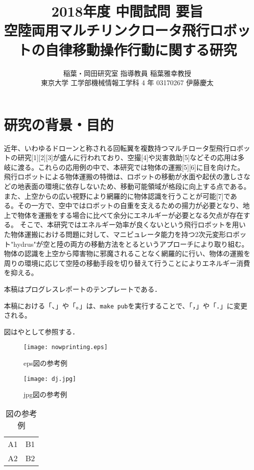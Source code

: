 \documentclass[twocolumn]{preport}
\title{2018年度 中間試問 要旨 \\
空陸両用マルチリンクロータ飛行ロボットの自律移動操作行動に関する研究}
\author{稲葉・岡田研究室 指導教員 稲葉雅幸教授 \\
東京大学 工学部機械情報工学科 4 年 03170267 伊藤慶太}
\begin{document}
\pagestyle{empty}
\maketitle
\thispagestyle{empty}
\sloppy

\section{研究の背景・目的}

近年、いわゆるドローンと称される回転翼を複数持つマルチロータ型飛行ロボットの研究[1][2][3]が盛んに行われており、空撮[4]や災害救助[5]などその応用は多岐に渡る。これらの応用例の中で、本研究では物体の運搬[5][6]に目を向けた。飛行ロボットによる物体運搬の特徴は、ロボットの移動が水面や起伏の激しさなどの地表面の環境に依存しないため、移動可能領域が格段に向上する点である。また、上空からの広い視野により網羅的に物体認識を行うことが可能[7]である。その一方で、空中ではロボットの自重を支えるための揚力が必要となり、地上で物体を運搬をする場合に比べて余分にエネルギーが必要となる欠点が存在する。
そこで、本研究ではエネルギー効率が良くないという飛行ロボットを用いた物体運搬における問題に対して、マニピュレータ能力を持つ2次元変形ロボット"hydrus"が空と陸の両方の移動方法をとるというアプローチにより取り組む。物体の認識を上空から障害物に邪魔されることなく網羅的に行い、物体の運搬を周りの環境に応じて空陸の移動手段を切り替えて行うことによりエネルギー消費を抑える。

本稿はプログレスレポートのテンプレートである\cite{Sakai}．

本稿における「、」や「。」は、\verb|make pub|を実行することで、「，」や「．」に変更される。

図はやとして参照する．

\begin{figure}[tbh]
 \begin{center}
  \begin{minipage}{0.3\columnwidth}
   \texttt{[image: nowprinting.eps]}
   \caption{eps図の参考例}
  \end{minipage}
  \hspace{0.15\columnwidth}
  \begin{minipage}{0.3\columnwidth}
   \texttt{[image: dj.jpg]}
   \caption{jpg図の参考例}
  \end{minipage}
  \label{figure:nowprinting}
 \end{center}
\end{figure}

\begin{table}[tbh]
 \begin{center}
  \begin{tabular}{|l|r|} \hline
  A1 & B1 \\
  A2 & B2 \\ \hline
  \end{tabular}
  \caption{図の参考例}
  \label{table:sample}
 \end{center}
\end{table}
\end{document}
